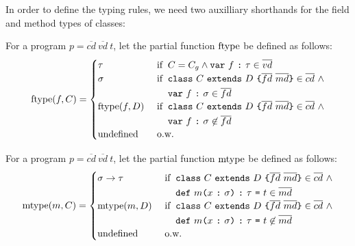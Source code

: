 In order to define the typing rules, we need two auxilliary shorthands for the
field and method types of classes:
\begin{definition}
  For a program $p = \overline{cd}~\overline{vd}~t$, let the partial function
  $\mbox{$\mathrm{ftype}$}$ be defined as follows:
  \begin{equation*}
    \mbox{$\mathrm{ftype}$}(f, C) = \begin{cases}
      \tau & \text{ if } \: C = C_g \land \mbox{\mdseries\texttt{var}~$f$~\texttt{:}~$\tau$} \in \overline{vd} \\
      \sigma & \text{ if } \: \begin{aligned}[t]
        &\mbox{\mdseries\texttt{class}~$C$~\texttt{extends}~$D$~\texttt{\{}$\overline{fd}$~$\overline{md}$\texttt{\}}} \in \overline{cd}~\land \\
        &\mbox{\mdseries\texttt{var}~$f$~\texttt{:}~$\sigma$} \in \overline{fd}
      \end{aligned} \\
      \mbox{$\mathrm{ftype}$}(f, D) & \text{ if } \: \begin{aligned}[t]
        &\mbox{\mdseries\texttt{class}~$C$~\texttt{extends}~$D$~\texttt{\{}$\overline{fd}$~$\overline{md}$\texttt{\}}} \in \overline{cd}~\land \\
        &\mbox{\mdseries\texttt{var}~$f$~\texttt{:}~$\sigma$} \not\in \overline{fd}
      \end{aligned} \\
      \text{undefined} & \text{ o.w.}
    \end{cases}
  \end{equation*}
\end{definition}
\begin{definition}
  For a program $p = \overline{cd}~\overline{vd}~t$, let the partial function
  $\mbox{$\mathrm{mtype}$}$ be defined as follows:
  \begin{equation*}
    \mbox{$\mathrm{mtype}$}(m, C) = \begin{cases}
      \sigma \to \tau & \text{ if } \: \begin{aligned}[t]
        &\mbox{\mdseries\texttt{class}~$C$~\texttt{extends}~$D$~\texttt{\{}$\overline{fd}$~$\overline{md}$\texttt{\}}} \in \overline{cd}~\land \\
        &\mbox{\mdseries\texttt{def}~$m$\texttt{(}$x$~\texttt{:}~$\sigma$\texttt{)}~\texttt{:}~$\tau$~\texttt{=}~$t$} \in \overline{md}
      \end{aligned} \\
      \mbox{$\mathrm{mtype}$}(m, D) & \text{ if } \: \begin{aligned}[t]
        &\mbox{\mdseries\texttt{class}~$C$~\texttt{extends}~$D$~\texttt{\{}$\overline{fd}$~$\overline{md}$\texttt{\}}} \in \overline{cd}~\land \\
        &\mbox{\mdseries\texttt{def}~$m$\texttt{(}$x$~\texttt{:}~$\sigma$\texttt{)}~\texttt{:}~$\tau$~\texttt{=}~$t$} \not\in \overline{md}
      \end{aligned} \\
      \text{undefined} & \text{ o.w.}
    \end{cases}
  \end{equation*}
\end{definition}

